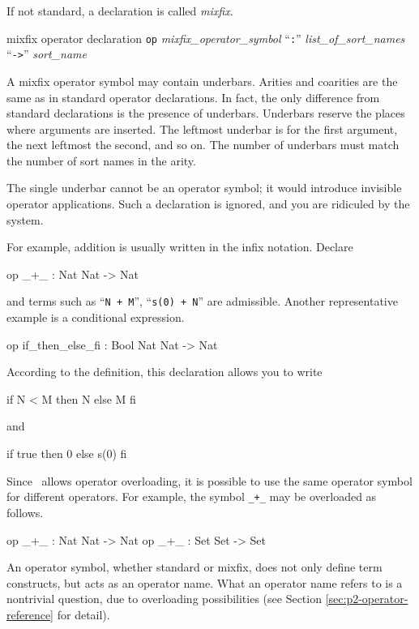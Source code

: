 \documentclass[a4paper]{memoir}
\begin{document}
If not standard, a declaration is called {\em mixfix}.

\begin{bsyntax} mixfix operator declaration \Hline
{}
\texttt{op} \textit{mixfix\_operator\_symbol} ``\texttt{:}'' \textit{list\_of\_sort\_names} ``\texttt{->}'' \textit{sort\_name}
\end{bsyntax}

A mixfix operator symbol may contain underbars. Arities and coarities
are the same as in standard operator declarations. In fact,
the only difference from standard declarations is the presence of
underbars. Underbars reserve the places where arguments are inserted.
The leftmost underbar is for the first argument, the next leftmost the
second, and so on. The number of underbars must match the number
of sort names in the arity.

\begin{warning}
  The single underbar cannot be an operator symbol; it would introduce
  invisible operator applications. Such a declaration is
  ignored, and you are ridiculed by the system.
\end{warning}

For example, addition is usually written in the infix notation. Declare
\begin{vvtm}
\begin{ccode}
  op _+_ : Nat Nat -> Nat
\end{ccode}
\end{vvtm}
and terms such as ``\texttt{N + M}'', ``\texttt{s(0) + N}'' are admissible.
Another representative example is a conditional expression.
\begin{vvtm}
\begin{ccode}
  op if_then_else_fi : Bool Nat Nat -> Nat
\end{ccode}
\end{vvtm}
According to the definition, this declaration allows you to write
\begin{vvtm}
\begin{ccode}
  if N < M then N else M fi
\end{ccode}
\end{vvtm}
and
\begin{vvtm}
\begin{ccode}
  if true then 0 else s(0) fi
\end{ccode}
\end{vvtm}
Since \cafeobj~allows operator overloading, it is
possible to use the same operator symbol for different operators.
For example, the symbol \verb|_+_| may be overloaded as follows.
\begin{vvtm}
\begin{ccode}
  op _+_ : Nat Nat -> Nat
  op _+_ : Set Set -> Set
\end{ccode}
\end{vvtm}
An operator symbol, whether standard or mixfix, does not only define
term constructs, but acts as an operator name. What an operator name
refers to is a nontrivial question, due to overloading possibilities
(see Section \ref{sec:p2-operator-reference} for detail).
\end{document}

